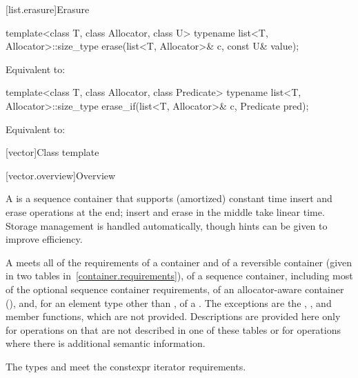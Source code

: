 [list.erasure]{Erasure}

%
\begin{itemdecl}
template<class T, class Allocator, class U>
  typename list<T, Allocator>::size_type
    erase(list<T, Allocator>& c, const U& value);
\end{itemdecl}

\begin{itemdescr}
\pnum
\effects
Equivalent to: 
\end{itemdescr}

%
\begin{itemdecl}
template<class T, class Allocator, class Predicate>
  typename list<T, Allocator>::size_type
    erase_if(list<T, Allocator>& c, Predicate pred);
\end{itemdecl}

\begin{itemdescr}
\pnum
\effects
Equivalent to: 
\end{itemdescr}

[vector]{Class template }

[vector.overview]{Overview}

\pnum
{}%
A
is a sequence container that supports
(amortized) constant time insert and erase operations at the end;
insert and erase in the middle take linear time.
Storage management is handled automatically, though hints can be given
to improve efficiency.

\pnum
A  meets all of the requirements of a container and of a
reversible container (given in two tables in~\ref{container.requirements}), of a
sequence container, including most of the optional sequence container
requirements, of an allocator-aware container
(),
and, for an element type other than ,
of a .
The exceptions are the
, , and  member functions, which are not
provided. Descriptions are provided here only for operations on 
that are not described in one of these tables or for operations where there is
additional semantic information.

\pnum
The types  and  meet
the constexpr iterator requirements.

